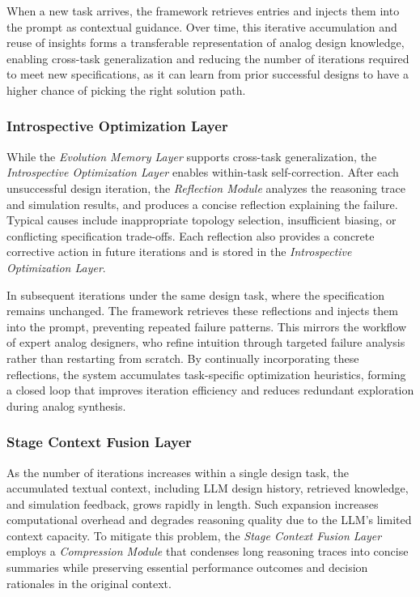\documentclass[sigconf,nonacm]{acmart}
\begin{document}
When a new task arrives, the framework retrieves entries and injects them into the prompt as contextual guidance. Over time, this iterative accumulation and reuse of insights forms a transferable representation of analog design knowledge, enabling cross-task generalization and reducing the number of iterations required to meet new specifications, as it can learn from prior successful designs to have a higher chance of picking the right solution path.





\subsubsection{Introspective Optimization Layer}



While the \emph{Evolution Memory Layer} supports cross-task generalization, the \emph{Introspective Optimization Layer} enables within-task self-correction. After each unsuccessful design iteration, the \emph{Reflection Module} analyzes the reasoning trace and simulation results, and produces a concise reflection explaining the failure. Typical causes include inappropriate topology selection, insufficient biasing, or conflicting specification trade-offs. Each reflection also provides a concrete corrective action in future iterations and is stored in the \emph{Introspective Optimization Layer}.

In subsequent iterations under the same design task, where the specification remains unchanged. The framework retrieves these reflections and injects them into the prompt, preventing repeated failure patterns. This mirrors the workflow of expert analog designers, who refine intuition through targeted failure analysis rather than restarting from scratch. By continually incorporating these reflections, the system accumulates task-specific optimization heuristics, forming a closed loop that improves iteration efficiency and reduces redundant exploration during analog synthesis.




\subsubsection{Stage Context Fusion Layer}


As the number of iterations increases within a single design task, the accumulated textual context, including LLM design history, retrieved knowledge, and simulation feedback, grows rapidly in length. Such expansion increases computational overhead and degrades reasoning quality due to the LLM’s limited context capacity. To mitigate this problem, the \emph{Stage Context Fusion Layer} employs a \emph{Compression Module} that condenses long reasoning traces into concise summaries while preserving essential performance outcomes and decision rationales in the original context.
\end{document}
